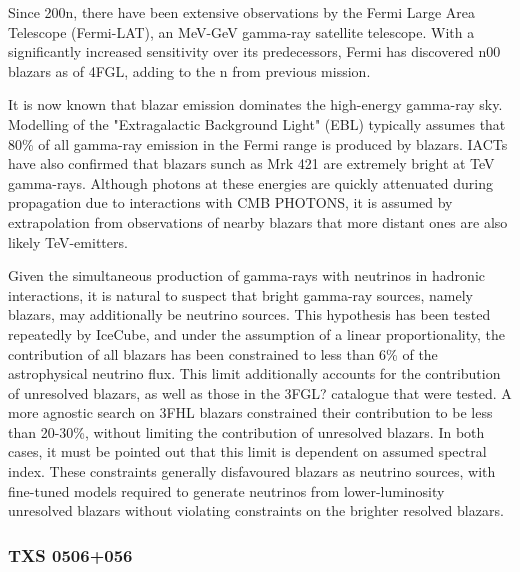 \documentclass[]{article}
\begin{document}
Since 200n, there have been extensive observations by the Fermi Large Area Telescope (Fermi-LAT), an MeV-GeV gamma-ray satellite telescope. With a significantly increased sensitivity over its predecessors, Fermi has discovered n00 blazars as of 4FGL, adding to the  n from previous mission.

It is now known that blazar emission dominates the high-energy gamma-ray sky. Modelling of the "Extragalactic Background Light" (EBL) typically assumes that 80\% of all gamma-ray emission in the Fermi range is produced by blazars. IACTs have also confirmed that blazars sunch as Mrk 421 are extremely bright at TeV gamma-rays. Although photons at these energies are quickly attenuated during propagation due to interactions with CMB PHOTONS, it is assumed by extrapolation from observations of nearby blazars that more distant ones are also likely TeV-emitters.

 Given the simultaneous production of gamma-rays with neutrinos in hadronic interactions, it is natural to suspect that bright gamma-ray sources, namely blazars, may additionally be neutrino sources. This hypothesis has been tested repeatedly by IceCube, and under the assumption of a linear proportionality, the contribution of all blazars has been constrained to less than 6\% of the astrophysical neutrino flux. This limit additionally accounts for the contribution of unresolved blazars, as well as those in the 3FGL? catalogue that were tested. A more agnostic search on 3FHL blazars constrained their contribution to be less than 20-30\%, without limiting the contribution of unresolved blazars. In both cases, it must be pointed out that this limit is dependent on assumed spectral index. These constraints generally disfavoured blazars as neutrino sources, with fine-tuned models required to generate neutrinos from lower-luminosity unresolved blazars without violating constraints on the brighter resolved blazars. 
 
 \subsubsection[TXS]{TXS 0506+056}
 
\end{document}
